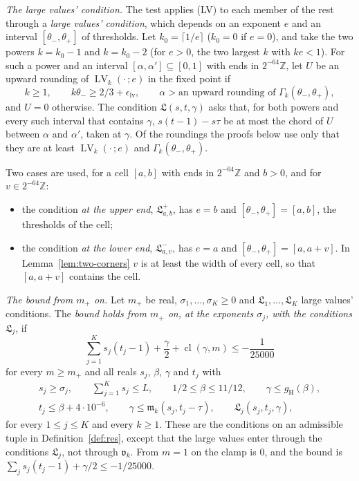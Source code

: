 \documentclass[11pt]{article}
\theoremstyle{definition}
\begin{document}
\emph{The large values' condition.} The test applies (LV) to each member of the rest through a \emph{large values'
condition}, which depends on an exponent $e$ and an interval $[\theta_-, \theta_+]$ of thresholds. Let $k_0 = \lceil
1/e \rceil$ ($k_0 = 0$ if $e = 0$), and take the two powers $k = k_0 - 1$ and $k = k_0 - 2$ (for $e > 0$, the two
largest $k$ with $ke < 1$). For such a power and an interval $[\alpha, \alpha'] \subseteq [0, 1]$ with ends in
$2^{-64}\mathbb Z$, let $U$ be an upward rounding of $\operatorname{LV}_k(\cdot\,; e)$ in the fixed point if
\[
  k \ge 1, \qquad k\theta_- \ge 2/3 + \epsilon_{\mathrm{lv}}, \qquad \alpha > \text{an upward rounding of }
  \Gamma_k(\theta_-, \theta_+),
\]
and $U = 0$ otherwise. The condition $\mathfrak L(s, t, \gamma)$ asks that, for both powers and every such interval
that contains $\gamma$, $s(t - 1) - s\tau$ be at most the chord of $U$ between $\alpha$ and $\alpha'$, taken at
$\gamma$. Of the roundings the proofs below use only that they are at least $\operatorname{LV}_k(\cdot\,; e)$ and
$\Gamma_k(\theta_-, \theta_+)$.

Two cases are used, for a cell $[a, b]$ with ends in $2^{-64}\mathbb Z$ and $b > 0$, and for $v \in 2^{-64}\mathbb Z$:
\begin{itemize}
\item the condition \emph{at the upper end}, $\mathfrak L^+_{a,b}$, has $e = b$ and $[\theta_-, \theta_+] = [a, b]$,
  the thresholds of the cell;
\item the condition \emph{at the lower end}, $\mathfrak L^-_{a,v}$, has $e = a$ and $[\theta_-, \theta_+] = [a, a +
  v]$. In Lemma~\ref{lem:two-corners} $v$ is at least the width of every cell, so that $[a, a + v]$ contains the cell.
\end{itemize}

\emph{The bound from $m_+$ on.} Let $m_+$ be real, $\sigma_1, \dots, \sigma_K \ge 0$ and $\mathfrak L_1, \dots,
\mathfrak L_K$ large values' conditions. The \emph{bound holds from $m_+$ on, at the exponents $\sigma_j$, with the
conditions $\mathfrak L_j$}, if
\[
  \sum_{j=1}^K s_j(t_j - 1) + \frac\gamma2 + \operatorname{cl}(\gamma, m) \le -\frac1{25000}
\]
for every $m \ge m_+$ and all reals $s_j$, $\beta$, $\gamma$ and $t_j$ with
\begin{gather*}
  s_j \ge \sigma_j, \qquad \sum_{j=1}^K s_j \le L, \qquad 1/2 \le \beta \le 11/12, \qquad \gamma \le g_{\mathrm
  H}(\beta), \\
  t_j \le \beta + 4 \cdot 10^{-6}, \qquad \gamma \le \mathfrak m_k(s_j, t_j - \tau), \qquad \mathfrak
  L_j(s_j, t_j, \gamma),
\end{gather*}
for every $1 \le j \le K$ and every $k \ge 1$.
These are the conditions on an admissible tuple in Definition~\ref{def:res}, except that the large values enter
through the conditions $\mathfrak L_j$, not through $\mathfrak v_k$. From $m = 1$ on the clamp is $0$, and the bound
is $\sum_j s_j(t_j - 1) + \gamma/2 \le
-1/25000$.
\end{document}
